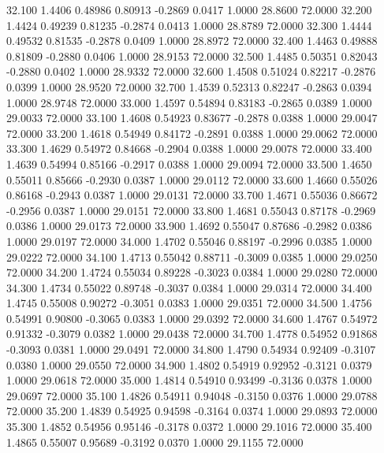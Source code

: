   32.100   1.4406   0.48986   0.80913  -0.2869   0.0417   1.0000  28.8600  72.0000
  32.200   1.4424   0.49239   0.81235  -0.2874   0.0413   1.0000  28.8789  72.0000
  32.300   1.4444   0.49532   0.81535  -0.2878   0.0409   1.0000  28.8972  72.0000
  32.400   1.4463   0.49888   0.81809  -0.2880   0.0406   1.0000  28.9153  72.0000
  32.500   1.4485   0.50351   0.82043  -0.2880   0.0402   1.0000  28.9332  72.0000
  32.600   1.4508   0.51024   0.82217  -0.2876   0.0399   1.0000  28.9520  72.0000
  32.700   1.4539   0.52313   0.82247  -0.2863   0.0394   1.0000  28.9748  72.0000
  33.000   1.4597   0.54894   0.83183  -0.2865   0.0389   1.0000  29.0033  72.0000
  33.100   1.4608   0.54923   0.83677  -0.2878   0.0388   1.0000  29.0047  72.0000
  33.200   1.4618   0.54949   0.84172  -0.2891   0.0388   1.0000  29.0062  72.0000
  33.300   1.4629   0.54972   0.84668  -0.2904   0.0388   1.0000  29.0078  72.0000
  33.400   1.4639   0.54994   0.85166  -0.2917   0.0388   1.0000  29.0094  72.0000
  33.500   1.4650   0.55011   0.85666  -0.2930   0.0387   1.0000  29.0112  72.0000
  33.600   1.4660   0.55026   0.86168  -0.2943   0.0387   1.0000  29.0131  72.0000
  33.700   1.4671   0.55036   0.86672  -0.2956   0.0387   1.0000  29.0151  72.0000
  33.800   1.4681   0.55043   0.87178  -0.2969   0.0386   1.0000  29.0173  72.0000
  33.900   1.4692   0.55047   0.87686  -0.2982   0.0386   1.0000  29.0197  72.0000
  34.000   1.4702   0.55046   0.88197  -0.2996   0.0385   1.0000  29.0222  72.0000
  34.100   1.4713   0.55042   0.88711  -0.3009   0.0385   1.0000  29.0250  72.0000
  34.200   1.4724   0.55034   0.89228  -0.3023   0.0384   1.0000  29.0280  72.0000
  34.300   1.4734   0.55022   0.89748  -0.3037   0.0384   1.0000  29.0314  72.0000
  34.400   1.4745   0.55008   0.90272  -0.3051   0.0383   1.0000  29.0351  72.0000
  34.500   1.4756   0.54991   0.90800  -0.3065   0.0383   1.0000  29.0392  72.0000
  34.600   1.4767   0.54972   0.91332  -0.3079   0.0382   1.0000  29.0438  72.0000
  34.700   1.4778   0.54952   0.91868  -0.3093   0.0381   1.0000  29.0491  72.0000
  34.800   1.4790   0.54934   0.92409  -0.3107   0.0380   1.0000  29.0550  72.0000
  34.900   1.4802   0.54919   0.92952  -0.3121   0.0379   1.0000  29.0618  72.0000
  35.000   1.4814   0.54910   0.93499  -0.3136   0.0378   1.0000  29.0697  72.0000
  35.100   1.4826   0.54911   0.94048  -0.3150   0.0376   1.0000  29.0788  72.0000
  35.200   1.4839   0.54925   0.94598  -0.3164   0.0374   1.0000  29.0893  72.0000
  35.300   1.4852   0.54956   0.95146  -0.3178   0.0372   1.0000  29.1016  72.0000
  35.400   1.4865   0.55007   0.95689  -0.3192   0.0370   1.0000  29.1155  72.0000
